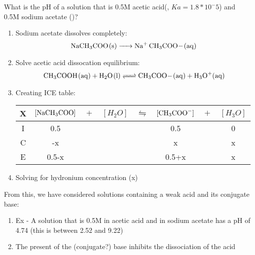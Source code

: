 \documentclass[../CHEM152Notes.tex]{subfiles}
\begin{document}
\begin{exmp}
    What is the pH of a solution that is 0.5M acetic acid(, $Ka = 1.8*10^-5$) and 0.5M sodium acetate ()?
\end{exmp}
\begin{enumerate}
    \item Sodium acetate dissolves completely:
    \begin{equation*}
        \begin{aligned}
            \ce{NaCH3COO_(s) -> Na+ CH3COO-_(aq)}
        \end{aligned}
    \end{equation*}
    \item Solve acetic acid dissocation equilibrium:
    \begin{equation*}
        \begin{aligned}
            \ce{CH3COOH_(aq) + H2O_(l) <=> CH3COO-_(aq) + H3O+_(aq)}
        \end{aligned}
    \end{equation*}
    \item Creating ICE table: %
    \begin{tabular}{c|c@{}c@{}c@{}c@{}c@{}c@{}c}
        \hline
        X   & $[\ce{NaCH3COO_}]$ & ${}+{}$ & $[H_2O]$ & ${}\leftrightharpoons{}$ & $[\ce{CH3COO-}]$ & ${}+{}$ & $[H_3O]$ \\
        \hline
        I   &  0.5    &&     &&  0.5    && 0  \\
        C   &  -x     &&     &&  x      && x   \\
        E   &  0.5-x  &&     &&  0.5+x  && x  \\      
    \end{tabular}
    \item Solving for hydronium concentration (x)
\end{enumerate}
From this, we have considered solutions containing a weak acid and its conjugate base:
\begin{enumerate}
    \item Ex - A solution that is 0.5M in acetic acid and in sodium acetate has a pH of 4.74 (this is between 2.52 and 9.22)
    \item The present of the (conjugate?) base inhibits the dissociation of the acid
\end{enumerate}
\end{document}
